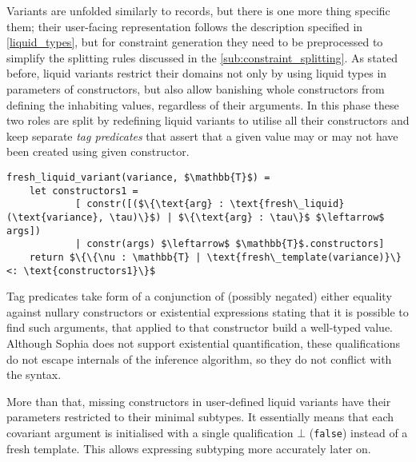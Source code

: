 Variants are unfolded similarly to records, but there is one more thing specific
them; their user-facing representation follows the description specified in
\autoref{liquid_types}, but for constraint generation they need to be
preprocessed to simplify the splitting rules discussed in the
\autoref{sub:constraint_splitting}. As stated before, liquid variants restrict
their domains not only by using liquid types in parameters of constructors, but
also allow banishing whole constructors from defining the inhabiting values,
regardless of their arguments. In this phase these two roles are split by
redefining liquid variants to utilise all their constructors and keep separate
\emph{tag predicates} that assert that a given value may or may not have been
created using given constructor.

\begin{lstlisting}[language=pseudocode]
fresh_liquid_variant(variance, $\mathbb{T}$) =
    let constructors1 =
            [ constr([($\{\text{arg} : \text{fresh\_liquid}(\text{variance}, \tau)\}$) | $\{\text{arg} : \tau\}$ $\leftarrow$ args])
            | constr(args) $\leftarrow$ $\mathbb{T}$.constructors]
    return $\{\{\nu : \mathbb{T} | \text{fresh\_template(variance)}\} <: \text{constructors1}\}$
\end{lstlisting}

Tag predicates take form of a conjunction of (possibly negated) either equality
against nullary constructors or existential expressions stating that it is
possible to find such arguments, that applied to that constructor build a
well-typed value. Although Sophia does not support existential quantification,
these qualifications do not escape internals of the inference algorithm, so they
do not conflict with the syntax.

More than that, missing constructors in user-defined liquid variants have
their parameters restricted to their minimal subtypes. It essentially means that
each covariant argument is initialised with a single qualification $\bot$
(\texttt{false}) instead of a fresh template. This allows expressing subtyping
more accurately later on.

